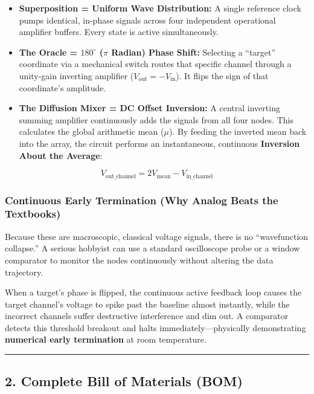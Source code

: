 \documentclass[
]{article}
\providecommand{\tightlist}{%
  \setlength{\itemsep}{0pt}\setlength{\parskip}{0pt}}
\begin{document}
\begin{itemize}
\tightlist
\item
  \textbf{Superposition = Uniform Wave Distribution:} A single reference
  clock pumps identical, in-phase signals across four independent
  operational amplifier buffers. Every state is active simultaneously.
\item
  \textbf{The Oracle = \(180^\circ\) (\(\pi\) Radian) Phase Shift:}
  Selecting a ``target'' coordinate via a mechanical switch routes that
  specific channel through a unity-gain inverting amplifier
  (\(V_{\text{out}} = -V_{\text{in}}\)). It flips the sign of that
  coordinate's amplitude.
\item
  \textbf{The Diffusion Mixer = DC Offset Inversion:} A central
  inverting summing amplifier continuously adds the signals from all
  four nodes. This calculates the global arithmetic mean (\(\mu\)). By
  feeding the inverted mean back into the array, the circuit performs an
  instantaneous, continuous \textbf{Inversion About the Average}:
\end{itemize}

\[V_{\text{out\_channel}} = 2V_{\text{mean}} - V_{\text{in\_channel}}\]

\subsubsection{Continuous Early Termination (Why Analog Beats the
Textbooks)}\label{continuous-early-termination-why-analog-beats-the-textbooks}

Because these are macroscopic, classical voltage signals, there is no
``wavefunction collapse.'' A serious hobbyist can use a standard
oscilloscope probe or a window comparator to monitor the nodes
continuously without altering the data trajectory.

When a target's phase is flipped, the continuous active feedback loop
causes the target channel's voltage to spike past the baseline almost
instantly, while the incorrect channels suffer destructive interference
and dim out. A comparator detects this threshold breakout and halts
immediately---physically demonstrating \textbf{numerical early
termination} at room temperature.

\begin{center}\rule{0.5\linewidth}{0.5pt}\end{center}

\subsection{2. Complete Bill of Materials
(BOM)}\label{complete-bill-of-materials-bom}
\end{document}
